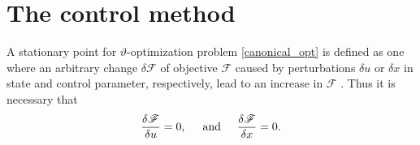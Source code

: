 
\section{The control method}

A stationary point for $\vartheta$-optimization problem \cref{canonical_opt} is defined as one where an arbitrary change $\delta \mathscr{F}$ of objective $\mathscr{F}$ caused by perturbations $\delta u$ or $\delta x$ in state and control parameter, respectively, lead to an increase in $\mathscr{F}$ \citep{bryson_1975}.  Thus it is necessary that 
\begin{align}
  \label{objective_perturbations}
  \frac{\delta \mathscr{F}}{\delta u} = 0, \hspace{5mm} \text{and} \hspace{5mm}
  \frac{\delta \mathscr{F}}{\delta x} = 0.
\end{align}

